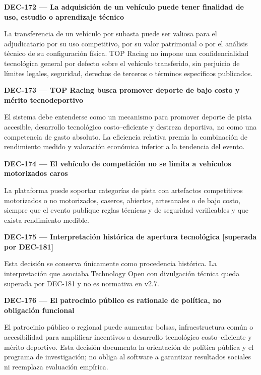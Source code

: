 \documentclass[10pt,letterpaper]{article}
\begin{document}
\noindent\textbf{DEC-172 --- La adquisición de un vehículo puede tener finalidad de uso, estudio o aprendizaje técnico}\par
La transferencia de un vehículo por subasta puede ser valiosa para el adjudicatario por su uso competitivo, por su valor patrimonial o por el análisis técnico de su configuración física. TOP Racing no impone una confidencialidad tecnológica general por defecto sobre el vehículo transferido, sin perjuicio de límites legales, seguridad, derechos de terceros o términos específicos publicados.\par\vspace{0.45em}
\noindent\textbf{DEC-173 --- TOP Racing busca promover deporte de bajo costo y mérito tecnodeportivo}\par
El sistema debe entenderse como un mecanismo para promover deporte de pista accesible, desarrollo tecnológico costo--eficiente y destreza deportiva, no como una competencia de gasto absoluto. La eficiencia relativa premia la combinación de rendimiento medido y valoración económica inferior a la tendencia del evento.\par\vspace{0.45em}
\noindent\textbf{DEC-174 --- El vehículo de competición no se limita a vehículos motorizados caros}\par
La plataforma puede soportar categorías de pista con artefactos competitivos motorizados o no motorizados, caseros, abiertos, artesanales o de bajo costo, siempre que el evento publique reglas técnicas y de seguridad verificables y que exista rendimiento medible.\par\vspace{0.45em}
\noindent\textbf{DEC-175 --- Interpretación histórica de apertura tecnológica [superada por DEC-181]}\par
Esta decisión se conserva únicamente como procedencia histórica. La interpretación que asociaba Technology Open con divulgación técnica queda superada por DEC-181 y no es normativa en v2.7.\par\vspace{0.45em}
\noindent\textbf{DEC-176 --- El patrocinio público es rationale de política, no obligación funcional}\par
El patrocinio público o regional puede aumentar bolsas, infraestructura común o accesibilidad para amplificar incentivos a desarrollo tecnológico costo--eficiente y mérito deportivo. Esta decisión documenta la orientación de política pública y el programa de investigación; no obliga al software a garantizar resultados sociales ni reemplaza evaluación empírica.\par\vspace{0.45em}
\end{document}
